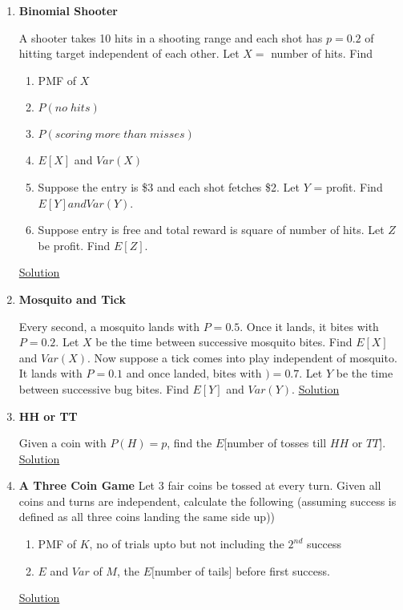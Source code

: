 \documentclass[../probability-notes.tex]{subfiles}
\begin{document}
\begin{enumerate}
    \item \hypertarget{q_binshoot}{\textbf{Binomial Shooter}}\newline
    A shooter takes 10 hits in a shooting range and each shot has $p=0.2$ of hitting target independent of each other. Let $X = $ number of hits. Find
    \begin{enumerate}
         \item PMF of $X$
         \item $P(no\;hits)$
         \item $P(scoring\;more\;than\;misses)$
         \item $E[X]$ and $Var(X)$
         \item Suppose the entry is \$3 and each shot fetches \$2. Let $Y$ = profit. Find $E[Y] and Var(Y)$.
         \item Suppose entry is free and total reward is square of number of hits. Let $Z$ be profit. Find $E[Z]$.
    \end{enumerate} \hyperlink{a_binshoot}{Solution}

    \item \hypertarget{q_mosquito}{\textbf{Mosquito and Tick}}\newline
    Every second, a mosquito lands with $P = 0.5$. Once it lands, it bites with $P=0.2$. Let $X$ be the time between successive mosquito bites. Find $E[X]$ and $Var(X)$.\newline
    Now suppose a tick comes into play independent of mosquito. It lands with $P=0.1$ and once landed, bites with $)=0.7$. Let $Y$ be the time between successive bug bites. Find $E[Y]$ and $Var(Y)$. \hyperlink{a_mosquito}{Solution}

    \item \hypertarget{q_hhtt}{\textbf{HH or TT}}\newline
    Given a coin with $P(H) = p$, find the $E$[number of tosses till $HH$ or $TT$]. \hyperlink{a_hhtt}{Solution}

    \item \label{itm:threecoins} \hypertarget{q_threecoins}{\textbf{A Three Coin Game}}\newline
    Let $3$ fair coins be tossed at every turn. Given all coins and turns are independent, calculate the following (assuming success is defined as all three coins landing the same side up))
    \begin{enumerate}
        \item PMF of $K$, no of trials upto but not including the $2^{nd}$ success
        \item $E$ and $Var$ of $M$, the $E[$number of tails$]$ before first success.
    \end{enumerate}
    \hyperlink{a_threecoins}{Solution}



\end{enumerate}
\end{document}

